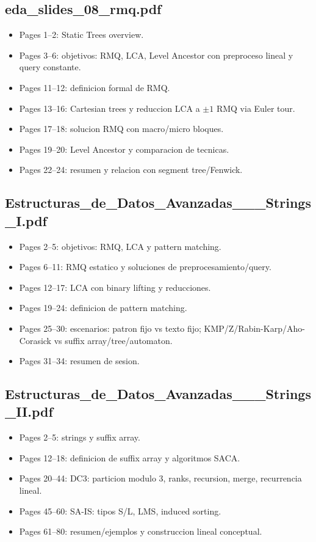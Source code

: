 \documentclass[10pt]{article}
\begin{document}
\subsection*{eda\_slides\_08\_rmq.pdf}
\begin{itemize}[leftmargin=*]
\item Pages 1--2: Static Trees overview.
\item Pages 3--6: objetivos: RMQ, LCA, Level Ancestor con preproceso lineal y query constante.
\item Pages 11--12: definicion formal de RMQ.
\item Pages 13--16: Cartesian trees y reduccion LCA a $\pm1$ RMQ via Euler tour.
\item Pages 17--18: solucion RMQ con macro/micro bloques.
\item Pages 19--20: Level Ancestor y comparacion de tecnicas.
\item Pages 22--24: resumen y relacion con segment tree/Fenwick.
\end{itemize}

\subsection*{Estructuras\_de\_Datos\_Avanzadas\_\_\_Strings\_I.pdf}
\begin{itemize}[leftmargin=*]
\item Pages 2--5: objetivos: RMQ, LCA y pattern matching.
\item Pages 6--11: RMQ estatico y soluciones de preprocesamiento/query.
\item Pages 12--17: LCA con binary lifting y reducciones.
\item Pages 19--24: definicion de pattern matching.
\item Pages 25--30: escenarios: patron fijo vs texto fijo; KMP/Z/Rabin-Karp/Aho-Corasick vs suffix array/tree/automaton.
\item Pages 31--34: resumen de sesion.
\end{itemize}

\subsection*{Estructuras\_de\_Datos\_Avanzadas\_\_\_Strings\_II.pdf}
\begin{itemize}[leftmargin=*]
\item Pages 2--5: strings y suffix array.
\item Pages 12--18: definicion de suffix array y algoritmos SACA.
\item Pages 20--44: DC3: particion modulo 3, ranks, recursion, merge, recurrencia lineal.
\item Pages 45--60: SA-IS: tipos S/L, LMS, induced sorting.
\item Pages 61--80: resumen/ejemplos y construccion lineal conceptual.
\end{itemize}
\end{document}
